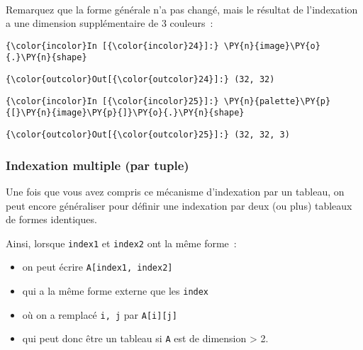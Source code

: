     \begin{center}
    \end{center}
    { \hspace*{\fill} \\}
    
    Remarquez que la forme générale n'a pas changé, mais le résultat de
l'indexation a une dimension supplémentaire de 3 couleurs~:

    \begin{Verbatim}[commandchars=\\\{\}]
{\color{incolor}In [{\color{incolor}24}]:} \PY{n}{image}\PY{o}{.}\PY{n}{shape}
\end{Verbatim}


\begin{Verbatim}[commandchars=\\\{\}]
{\color{outcolor}Out[{\color{outcolor}24}]:} (32, 32)
\end{Verbatim}
            
    \begin{Verbatim}[commandchars=\\\{\}]
{\color{incolor}In [{\color{incolor}25}]:} \PY{n}{palette}\PY{p}{[}\PY{n}{image}\PY{p}{]}\PY{o}{.}\PY{n}{shape}
\end{Verbatim}


\begin{Verbatim}[commandchars=\\\{\}]
{\color{outcolor}Out[{\color{outcolor}25}]:} (32, 32, 3)
\end{Verbatim}
            
    \hypertarget{indexation-multiple-par-tuple}{%
\subsubsection{Indexation multiple (par
tuple)}\label{indexation-multiple-par-tuple}}

    Une fois que vous avez compris ce mécanisme d'indexation par un tableau,
on peut encore généraliser pour définir une indexation par deux (ou
plus) tableaux de formes identiques.

    Ainsi, lorsque \texttt{index1} et \texttt{index2} ont la même forme~:

\begin{itemize}
\tightlist
\item
  on peut écrire \texttt{A{[}index1,\ index2{]}}
\item
  qui a la même forme externe que les \texttt{index}
\item
  où on a remplacé \texttt{i,\ j} par \texttt{A{[}i{]}{[}j{]}}
\item
  qui peut donc être un tableau si \texttt{A} est de dimension
  \textgreater{} 2.
\end{itemize}

